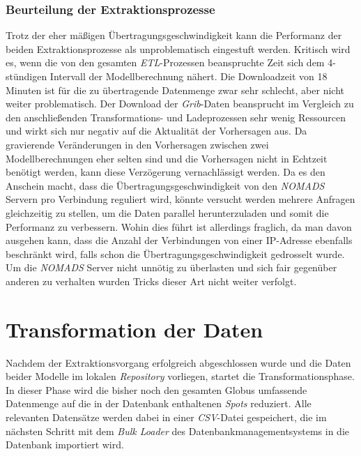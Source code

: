 \subsubsection{Beurteilung der Extraktionsprozesse}
Trotz der eher mäßigen Übertragungsgeschwindigkeit kann die Performanz
der beiden Extraktionsprozesse als unproblematisch eingestuft
werden. Kritisch wird es, wenn die von den gesamten
\textit{ETL}-Prozessen beanspruchte Zeit sich dem 4-stündigen
Intervall der Modellberechnung nähert. Die Downloadzeit von 18 Minuten
ist für die zu übertragende Datenmenge zwar sehr schlecht, aber nicht
weiter problematisch. Der Download der \textit{Grib}-Daten beansprucht
im Vergleich zu den anschließenden Transformations- und Ladeprozessen
sehr wenig Ressourcen und wirkt sich nur negativ auf die Aktualität
der Vorhersagen aus. Da gravierende Veränderungen in den Vorhersagen
zwischen zwei Modellberechnungen eher selten sind und die Vorhersagen
nicht in Echtzeit benötigt werden, kann diese Verzögerung
vernachlässigt werden. Da es den Anschein macht, dass die
Übertragungsgeschwindigkeit von den \textit{NOMADS} Servern pro
Verbindung reguliert wird, könnte versucht werden mehrere Anfragen
gleichzeitig zu stellen, um die Daten parallel herunterzuladen und
somit die Performanz zu verbessern. Wohin dies führt ist allerdings
fraglich, da man davon ausgehen kann, dass die Anzahl der Verbindungen
von einer IP-Adresse ebenfalls beschränkt wird, falls schon die
Übertragungsgeschwindigkeit gedrosselt wurde. Um die \textit{NOMADS}
Server nicht unnötig zu überlasten und sich fair gegenüber anderen zu
verhalten wurden Tricks dieser Art nicht weiter verfolgt.

\section{Transformation der Daten}
Nachdem der Extraktionsvorgang erfolgreich abgeschlossen wurde und die
Daten beider Modelle im lokalen \textit{Repository} vorliegen, startet
die Transformationsphase. In dieser Phase wird die bisher noch den
gesamten Globus umfassende Datenmenge auf die in der Datenbank
enthaltenen \textit{Spots} reduziert. Alle relevanten Datensätze
werden dabei in einer \textit{CSV}-Datei
 gespeichert, die im
nächsten Schritt mit dem \textit{Bulk Loader} des
Datenbankmanagementsystems in die Datenbank importiert wird.

